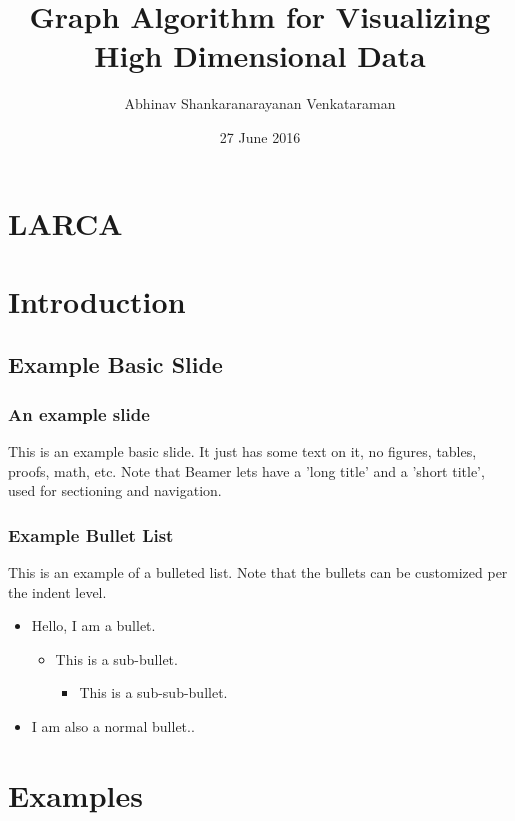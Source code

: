 \documentclass{beamer}
\title{Graph Algorithm for  Visualizing High Dimensional Data}
\author{Abhinav Shankaranarayanan Venkataraman}
\institute{Universitat Politecnica de Catalunya (UPC), Barcelona}
\date{27 June 2016}
\begin{document}
\frame{\titlepage}

\section[Outline]{}
\frame{\tableofcontents}
\section*{LARCA}
\section{Introduction}
\subsection[Basic Slide]{Example Basic Slide}

\frame
{
	\frametitle{An example slide}
	
	This is an example basic slide. It just has some text on it, no figures, tables, proofs, math, etc.  Note that Beamer lets have a 'long title' and a 'short title', used for sectioning and navigation.
}

\frame
{
	\frametitle{Example Bullet List}

	This is an example of a bulleted list. Note that the bullets can be customized per the indent level.
	
	\begin{itemize}
	\item Hello, I am a bullet.
	\begin{itemize}
		\item This is a sub-bullet.
		\begin{itemize}
			\item This is a sub-sub-bullet.
		\end{itemize}
	\end{itemize}
	\vspace{\baselineskip}
	\item I am also a normal bullet..
	\end{itemize}
}

\section{Examples}
\end{document}
